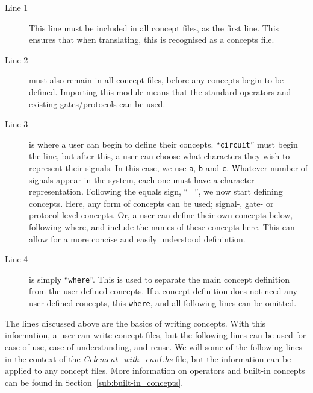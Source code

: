 \documentclass{proc}
\begin{document}
\begin{description}
  \item [Line 1]
  This line must be included in all concept files, as the first line. This ensures that when translating, this is recognised as a concepts file.
  
  \item [Line 2] must also remain in all concept files, before any concepts begin to be defined. Importing this module means that the standard operators and existing gates/protocols can be 
  used. 
  
  
  \item [Line 3] is where a user can begin to define their concepts. ``\texttt{circuit}'' must begin the line, but after this, a user can choose what characters they wish to represent their 
  signals. In this case, we use \texttt{a}, \texttt{b} and \texttt{c}. Whatever number of signals appear in the system, each one must have a character representation. Following the equals 
  sign, ``='', we now start defining concepts. Here, any form of concepts can be used; signal-, gate- or protocol-level concepts. Or, a user can define their own concepts below, following 
  where, and include the names of these concepts here. This can allow for a more concise and easily understood definintion.
  
  \item [Line 4] is simply ``\texttt{where}''. This is used to separate the main concept definition from the user-defined concepts. If a concept definition does not need any user defined 
  concepts, this \texttt{where}, and all following lines can be omitted.

\end{description}

The lines discussed above are the basics of writing concepts. With this information, a user can write concept files, but the following lines can be used for ease-of-use, ease-of-understanding, 
and reuse. We will some of the following lines in the context of the \emph{Celement\_with\_env1.hs} file, but the information can be applied to any concept files. More information on 
operators and built-in concepts can be found in Section~\ref{sub:built-in_concepts}.
\end{document}
